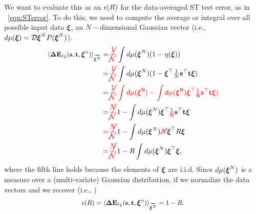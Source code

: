 We want to evaluate this as an \EffectivePotential $\epsilon(R)$ for the data-averaged ST test error, as in \EQN~\ref{eqn:STerror}.
To do this, we need to compute the average or integral over all possible input data $\boldsymbol{\xi}$,
an $N-$dimensional Gaussian vector (i.e., $d\mu(\boldsymbol{\xi})=\mathcal{D}\boldsymbol{\xi}^{N} P(\boldsymbol{\xi}^{N})$).
%
\begin{align}
 \langle\DETOPSTLL\rangle_{\AVGNDXI}  
   = &\red{\cancel{\frac{1}{\mathcal{N}}}}\int d\mu(\NDXI)(1-\ETA(\XI)) \\ \nonumber
   = &\red{\cancel{\frac{1}{\mathcal{N}}}}\int d\mu(\NDXI)(1-\XI^{\top}\tfrac{1}{N}\SVEC^{\top}\TVEC\XI) \\ \label{eqn:XI_ST} 
   = &\red{\cancel{\frac{1}{\mathcal{N}}}\int d\mu(\NDXI)-\int d\mu(\NDXI)\XI^{\top}\tfrac{1}{N}\SVEC^{\top}\TVEC\XI) } \\ \nonumber
   = & \red{\cancel{\frac{N}{\mathcal{N}}}}1 - \int d\mu(\NDXI)\XI^{\top}\red{\tfrac{1}{N}}\SVEC^{\top}\TVEC\XI \\ \nonumber
   = & \red{\cancel{\frac{N}{\mathcal{N}}}}1 - \int d\mu(\NDXI)\red{\cancel{N}}\XI^{\top} R\XI \\ \nonumber
   = & \red{\cancel{\frac{N}{\mathcal{N}}}}1 - R\int d\mu(\NDXI)\XI^{\top}\XI,
\end{align}
where the fifth line holds because the elements of $\boldsymbol{\xi}$ are i.i.d.
Since $d\mu(\boldsymbol{\xi}^{N})$ is a measure over a (multi-variate) Gaussian distribution,
if we normalize the data vectors  and we recover (i.e., \red{\EQN~\ref{eqn:epsl}})
\begin{align}
\label{eqn:e0}
\EPSL(R)=\langle\DETOPSTLL\rangle_{\AVGNDXI} =  1 - R .
\end{align}
